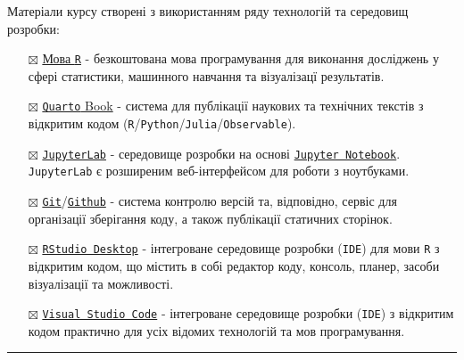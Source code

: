 \documentclass[
  letterpaper,
  DIV=11,
  numbers=noendperiod]{scrreprt}
\begin{document}
\begin{tcolorbox}[enhanced jigsaw, colframe=quarto-callout-note-color-frame, leftrule=.75mm, bottomrule=.15mm, breakable, opacityback=0, left=2mm, rightrule=.15mm, arc=.35mm, colback=white, toprule=.15mm]
\begin{minipage}[t]{5.5mm}
\textcolor{quarto-callout-note-color}{\faInfo}
\end{minipage}%
\begin{minipage}[t]{\textwidth - 5.5mm}

Матеріали курсу створені з використанням ряду технологій та середовищ
розробки:

\begin{itemize}
\item[$\boxtimes$]
  \href{https://www.r-project.org}{Мова \texttt{R}} - безкоштована мова
  програмування для виконання досліджень у сфері статистики, машинного
  навчання та візуалізацї результатів.
\item[$\boxtimes$]
  \href{https://quarto.org}{\texttt{Quarto} Book} - система для
  публікації наукових та технічних текстів з відкритим кодом
  (\texttt{R}/\texttt{Python}/\texttt{Julia}/\texttt{Observable}).
\item[$\boxtimes$]
  \href{https://github.com/jupyterlab/jupyterlab}{\texttt{JupyterLab}} -
  середовище розробки на основі
  \href{https://jupyter.org/}{\texttt{Jupyter\ Notebook}}.
  \texttt{JupyterLab} є розширеним веб-інтерфейсом для роботи з
  ноутбуками.
\item[$\boxtimes$]
  \href{https://git-scm.com/}{\texttt{Git}}/\href{https://github.com/}{\texttt{Github}}
  - система контролю версій та, відповідно, сервіс для організації
  зберігання коду, а також публікації статичних сторінок.
\item[$\boxtimes$]
  \href{https://www.rstudio.com/}{\texttt{RStudio\ Desktop}} -
  інтегроване середовище розробки (\texttt{IDE}) для мови \texttt{R} з
  відкритим кодом, що містить в собі редактор коду, консоль, планер,
  засоби візуалізації та можливості.
\item[$\boxtimes$]
  \href{https://code.visualstudio.com/}{\texttt{Visual\ Studio\ Code}} -
  інтегроване середовище розробки (\texttt{IDE}) з відкритим кодом
  практично для усіх відомих технологій та мов програмування.
\end{itemize}

\end{minipage}%
\end{tcolorbox}

\begin{center}\rule{0.5\linewidth}{0.5pt}\end{center}
\end{document}
